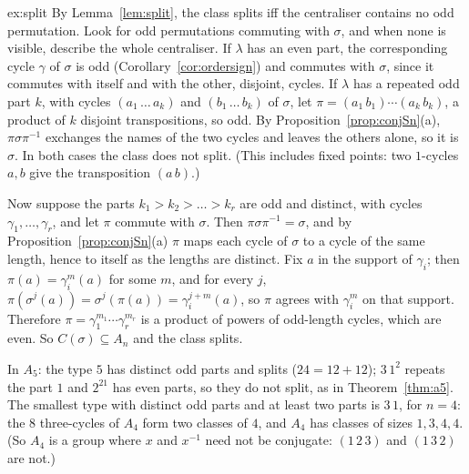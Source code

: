 \begin{solution}{ex:split}
\idea By Lemma~\ref{lem:split}, the class splits iff the centraliser contains no odd permutation. Look for odd permutations commuting with $\sigma$, and when none is visible, describe the whole centraliser.
\writeup If $\lambda$ has an even part, the corresponding cycle $\gamma$ of $\sigma$ is odd (Corollary~\ref{cor:ordersign}) and commutes with $\sigma$, since it commutes with itself and with the other, disjoint, cycles. If $\lambda$ has a repeated odd part $k$, with cycles $(a_1\,\dots\,a_k)$ and $(b_1\,\dots\,b_k)$ of $\sigma$, let $\pi=(a_1\,b_1)\cdots(a_k\,b_k)$, a product of $k$ disjoint transpositions, so odd. By Proposition~\ref{prop:conjSn}(a), $\pi\sigma\pi^{-1}$ exchanges the names of the two cycles and leaves the others alone, so it is $\sigma$. In both cases the class does not split. (This includes fixed points: two $1$-cycles $a,b$ give the transposition $(a\,b)$.)

Now suppose the parts $k_1>k_2>\dots>k_r$ are odd and distinct, with cycles $\gamma_1,\dots,\gamma_r$, and let $\pi$ commute with $\sigma$. Then $\pi\sigma\pi^{-1}=\sigma$, and by Proposition~\ref{prop:conjSn}(a) $\pi$ maps each cycle of $\sigma$ to a cycle of the same length, hence to itself as the lengths are distinct. Fix $a$ in the support of $\gamma_i$; then $\pi(a)=\gamma_i^m(a)$ for some $m$, and for every $j$, $\pi(\sigma^j(a))=\sigma^j(\pi(a))=\gamma_i^{j+m}(a)$, so $\pi$ agrees with $\gamma_i^m$ on that support. Therefore $\pi=\gamma_1^{m_1}\cdots\gamma_r^{m_r}$ is a product of powers of odd-length cycles, which are even. So $C(\sigma)\subseteq A_n$ and the class splits.

In $A_5$: the type $5$ has distinct odd parts and splits ($24=12+12$); $3\,1^2$ repeats the part $1$ and $2^21$ has even parts, so they do not split, as in Theorem~\ref{thm:a5}. The smallest type with distinct odd parts and at least two parts is $3\,1$, for $n=4$: the $8$ three-cycles of $A_4$ form two classes of $4$, and $A_4$ has classes of sizes $1,3,4,4$. (So $A_4$ is a group where $x$ and $x^{-1}$ need not be conjugate: $(1\,2\,3)$ and $(1\,3\,2)$ are not.)
\end{solution}

